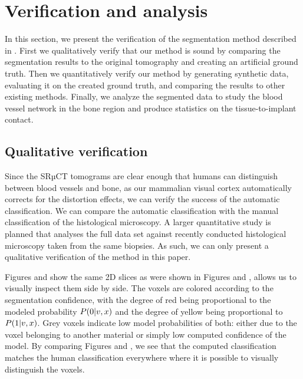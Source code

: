 \section{Verification and analysis}
\label{sec:verification}

In this section, we present the verification of the segmentation method
described in . First we qualitatively verify that our method
is sound by comparing the segmentation results to the original tomography and
creating an artificial ground truth. Then we quantitatively verify our method
by generating synthetic data, evaluating it on the created ground truth, and
comparing the results to other existing methods. Finally, we analyze the
segmented data to study the blood vessel network in the bone region and produce
statistics on the tissue-to-implant contact.

\subsection{Qualitative verification}

Since the SRµCT tomograms are clear enough that humans can distinguish between
blood vessels and bone, as our mammalian visual cortex automatically corrects
for the distortion effects, we can verify the success of the automatic
classification. We can compare the automatic classification with the manual
classification of the histological microscopy. A larger quantitative study is
planned that analyses the full data set against recently conducted histological
microscopy taken from the same biopsies. As such, we can only present a
qualitative verification of the method in this paper.

Figures  and 
show the same 2D slices as were shown in Figures  and
, allows us to visually inspect them side by side. The voxels
are colored according to the segmentation confidence, with the degree of red
being proportional to the modeled probability $P\!\left(0\middle\vert v,x\right)$ and the degree
of yellow being proportional to $P\!\left(1\middle\vert v,x\right)$. Grey voxels indicate low
model probabilities of both: either due to the voxel belonging to another
material or simply low computed confidence of the model. By comparing Figures
 and , we see
that the computed classification matches the human classification everywhere
where it is possible to visually distinguish the voxels.

